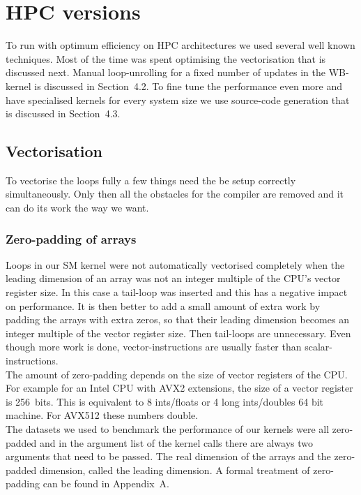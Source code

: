 \documentclass[11pt]{article}
\numberwithin{figure}{section}
\numberwithin{table}{section}
\begin{document}
  \section{HPC versions}
    To run with optimum efficiency on HPC architectures we used several well known techniques. Most of the time was spent optimising the vectorisation that is discussed next. Manual loop-unrolling for a fixed number of updates in the WB-kernel is discussed in Section~4.2. To fine tune the performance even more and have specialised kernels for every system size we use source-code generation that is discussed in Section~4.3.

    \subsection{Vectorisation}
        To vectorise the loops fully a few things need the be setup correctly simultaneously. Only then all the obstacles for the compiler are removed and it can do its work the way we want.
      \subsubsection{Zero-padding of arrays}
      Loops in our SM kernel were not automatically vectorised completely when the leading dimension of an array was not an integer multiple of the CPU's vector register size. In this case a tail-loop was inserted and this has a negative impact on performance. It is then better to add a small amount of extra work by padding the arrays with extra zeros, so that their leading dimension becomes an integer multiple of the vector register size. Then tail-loops are unnecessary. Even though more work is done, vector-instructions are usually faster than scalar-instructions.\\
				
      The amount of zero-padding depends on the size of vector registers of the CPU. For example for an Intel CPU with AVX2 extensions, the size of a vector register is 256~bits. This is equivalent to 8 ints/floats or 4 long ints/doubles 64 bit machine. For AVX512 these numbers double.\\
      
      The datasets we used to benchmark the performance of our kernels were all zero-padded and in the argument list of the kernel calls there are always two arguments that need to be passed. The real dimension of the arrays and the zero-padded dimension, called the leading dimension. A formal treatment of zero-padding can be found in Appendix~A.
\end{document}
